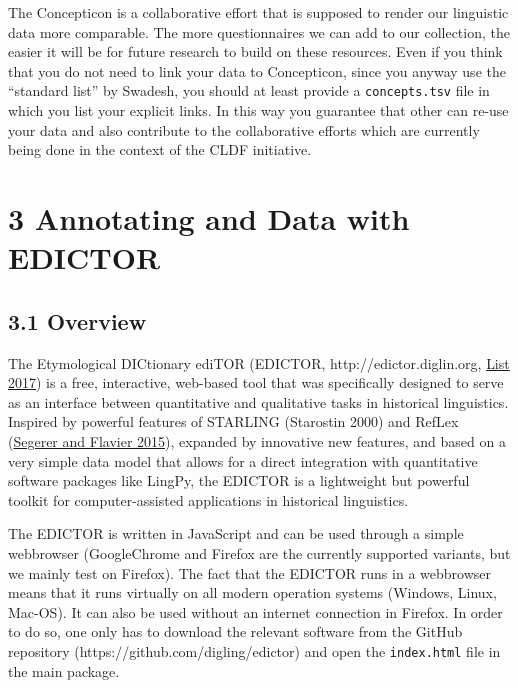 \documentclass[a4paper,svgnames]{scrartcl}
\begin{document}

The Concepticon is a collaborative effort that is supposed to render our
linguistic data more comparable. The more questionnaires we can add to
our collection, the easier it will be for future research to build on
these resources. Even if you think that you do not need to link your
data to Concepticon, since you anyway use the ``standard list'' by
Swadesh, you should at least provide a \texttt{concepts.tsv} file in
which you list your explicit links. In this way you guarantee that other
can re-use your data and also contribute to the collaborative efforts
which are currently being done in the context of the CLDF initiative.

\section*{3 Annotating and Data with
EDICTOR}\label{annotating-and-data-with-edictor}

\subsection*{3.1 Overview}\label{overview}

The Etymological DICtionary ediTOR (EDICTOR, http://edictor.diglin.org,
\href{http://bibliography.lingpy.org?key=List2017d}{List 2017}) is a
free, interactive, web-based tool that was specifically designed to
serve as an interface between quantitative and qualitative tasks in
historical linguistics. Inspired by powerful features of STARLING
(Starostin 2000) and RefLex
(\href{http://bibliography.lingpy.org?key=Segerer2015}{Segerer and
Flavier 2015}), expanded by innovative new features, and based on a very
simple data model that allows for a direct integration with quantitative
software packages like LingPy, the EDICTOR is a lightweight but powerful
toolkit for computer-assisted applications in historical linguistics.

The EDICTOR is written in JavaScript and can be used through a simple
webbrowser (GoogleChrome and Firefox are the currently supported
variants, but we mainly test on Firefox). The fact that the EDICTOR runs
in a webbrowser means that it runs virtually on all modern operation
systems (Windows, Linux, Mac-OS). It can also be used without an
internet connection in Firefox. In order to do so, one only has to
download the relevant software from the GitHub repository
(https://github.com/digling/edictor) and open the \texttt{index.html}
file in the main package.
\end{document}
